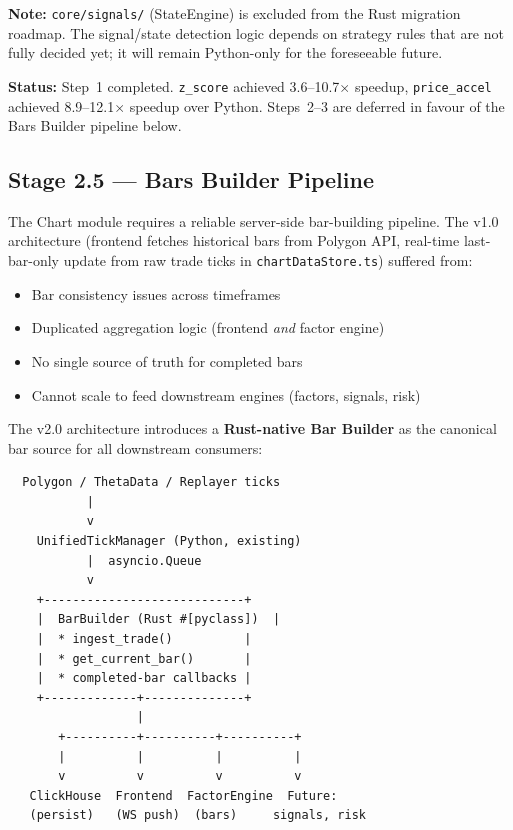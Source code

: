 \documentclass[a4paper, 11pt]{article}
\begin{document}
\noindent\textbf{Note:} \texttt{core/signals/} (StateEngine) is excluded from the Rust migration roadmap.
The signal/state detection logic depends on strategy rules that are not fully decided yet;
it will remain Python-only for the foreseeable future.

\noindent\textbf{Status:} Step~1 completed. \texttt{z\_score} achieved 3.6--10.7$\times$ speedup,
\texttt{price\_accel} achieved 8.9--12.1$\times$ speedup over Python.
Steps~2--3 are deferred in favour of the Bars Builder pipeline below.

\pagebreak

\subsection{Stage 2.5 --- Bars Builder Pipeline}
\label{sec:bars-builder}

The Chart module requires a reliable server-side bar-building pipeline.
The v1.0 architecture (frontend fetches historical bars from Polygon API, real-time
last-bar-only update from raw trade ticks in \texttt{chartDataStore.ts}) suffered from:
\begin{itemize}[nosep]
    \item Bar consistency issues across timeframes
    \item Duplicated aggregation logic (frontend \emph{and} factor engine)
    \item No single source of truth for completed bars
    \item Cannot scale to feed downstream engines (factors, signals, risk)
\end{itemize}

\noindent The v2.0 architecture introduces a \textbf{Rust-native Bar Builder} as the canonical
bar source for all downstream consumers:

\begin{verbatim}
  Polygon / ThetaData / Replayer ticks
           |
           v
    UnifiedTickManager (Python, existing)
           |  asyncio.Queue
           v
    +----------------------------+
    |  BarBuilder (Rust #[pyclass])  |
    |  * ingest_trade()          |
    |  * get_current_bar()       |
    |  * completed-bar callbacks |
    +-------------+--------------+
                  |
       +----------+----------+----------+
       |          |          |          |
       v          v          v          v
   ClickHouse  Frontend  FactorEngine  Future:
   (persist)   (WS push)  (bars)     signals, risk
\end{verbatim}
\end{document}
